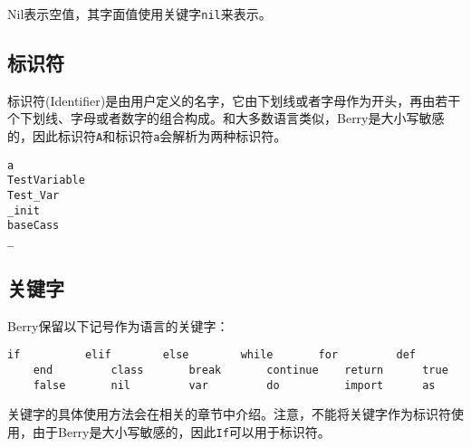 Nil表示空值，其字面值使用关键字\texttt{nil}来表示。

\subsection{标识符}

标识符(Identifier)是由用户定义的名字，它由下划线或者字母作为开头，再由若干个下划线、字母或者数字的组合构成。和大多数语言类似，Berry是大小写敏感的，因此标识符\texttt{A}和标识符\texttt{a}会解析为两种标识符。
\begin{lstlisting}[language=berry, numbers=none]
a
TestVariable
Test_Var
_init
baseCass
_
\end{lstlisting}

\subsection{关键字}

Berry保留以下记号作为语言的关键字：
\begin{lstlisting}[language=berry, numbers=none]
    if          elif        else        while       for         def
    end         class       break       continue    return      true
    false       nil         var         do          import      as
\end{lstlisting}

关键字的具体使用方法会在相关的章节中介绍。注意，不能将关键字作为标识符使用，由于Berry是大小写敏感的，因此\texttt{If}可以用于标识符。

